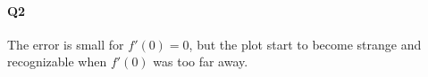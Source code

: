 \documentclass[11pt]{article}
\begin{document}
\paragraph{Q2}
The error is small for $f'(0)=0$, but the plot start to become strange and recognizable when $f'(0)$ was too far away.
\begin{figure}[H]
	\centering
\end{figure}
\end{document}
